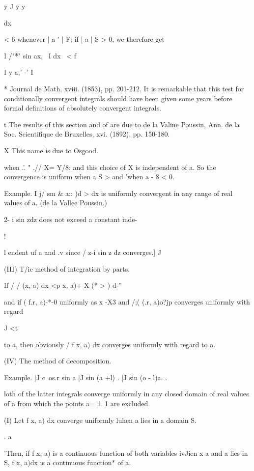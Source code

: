 y J y y

dx

< 6 whenever | a ' | F; if | a | S > 0, we therefore get

I /"*" sin ax, \ I dx \ < f

I y a;' -' I

* Journal de Math, xviii. (1853), pp. 201-212. It is remarkable that
this test for conditionally convergent integrals should have been
given some years before formal definitions of absolutely convergent
integrals.

t The results of this section and of  are due to de la Valine
Poussin, Ann. de la Soc. Scientifique de Bruxelles, xvi. (1892), pp.
150-180.

X This name is due to Osgood.

%
%

when .'. " .// X= Y/8; and this choice of X is independent of a. So
the convergence is uniform when a S > and 'when a - 8 < 0.

Example. I j/ sm \& a:: )d > dx is uniformly convergent in any range
of real values of a. (de la Vallee Poussin.)

2- i sin zdz does not exceed a constant inde-

!

l endent uf a and .v since / z-i sin z dz converges.] J

(III) T/ie method of integration by parts.

If / / (x, a) dx <p x, a)+ X (* > ) d-''

and if ( f.r, a)-*-0 uniformly as x -X3 and /;( (.r, a)o?jp converges
uniformly with regard

J <t

to a, then obviously / f x, a) dx converges uniformly with regard to
a.

(IV) The method of decomposition.

Example. |J c\ os.r sin a |J sin (a +l) . |J sin (o - l)a. .

loth of the latter integrals converge uniformly in any closed domain
of real values of a from which the points a= ± 1 are excluded.

(I)
Let f x, a) dx converge uniformly luhen a lies in a domain S.

. a

'Then, if f x, a) is a continuous function of both variables ivJien x
a and a lies in S, f x, a)dx is a continuous function* of a.

